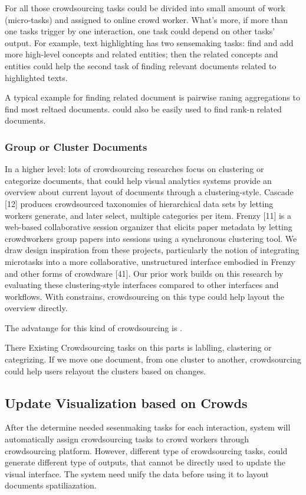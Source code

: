 \documentclass[journal]{vgtc}                %
\begin{document}
For all those crowdsourcing tasks could be divided into small amount of work (micro-tasks) and assigned to online crowd worker. What's more, if more than one tasks trigger by one interaction, one task could depend on other tasks' output. For example, text highlighting has two sensemaking tasks: find and add more high-level concepts and related entities; then the related concepts and entities could help the second task of finding relevant documents related to highlighted texts.

A typical example for finding related document is pairwise raning aggregations to find most reltaed documents. could also be easily used to find rank-n related documents.

\subsubsection{Group or Cluster Documents}

In a higher level: lots of crowdsourcing researches focus on clustering or categorize documents, that could help visual analytics systems provide an overview about current layout of documents through a clustering-style.  Cascade [12] produces crowdsourced taxonomies of hierarchical data sets by letting workers generate, and later select, multiple categories per item. Frenzy [11] is a web-based collaborative session organizer that elicits paper metadata by letting crowdworkers group papers into sessions using a synchronous clustering tool. We draw design inspiration from these projects, particularly the notion of integrating microtasks into a more collaborative, unstructured interface embodied in Frenzy and other forms of crowdware [41]. Our prior work builds on this research by evaluating these clustering-style interfaces compared to other interfaces and workflows. With constrains, crowdsourcing on this type could help layout the overview directly.

The advatange for this kind of crowdsourcing is .

There Existing Crowdsourcing tasks on this parts is lablling, clastering or categrizing. If we move one document, from one cluster to another, crowdsourcing could help users relayout the clusters based on changes.

\subsection{Update Visualization based on Crowds}
After the determine needed sesenmaking tasks for each interaction, system will automatically assign crowdsourcing tasks to crowd workers through crowdsourcing platform. However, different type of crowdsourcing tasks, could generate different type of outputs, that cannot be directly used to update the visual interface. The system need unify the data before using it to layout documents spatiliazation.
\end{document}
